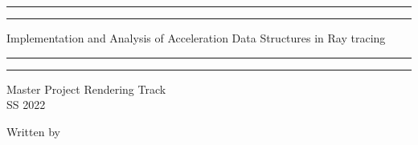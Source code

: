 \documentclass[11pt,a4paper]{article}
\begin{document}
  

\begin{titlepage} %

	\centering %
	
	\scshape %
	
	\vspace*{\baselineskip} %
	
	
	
	\rule{\textwidth}{1.6pt}\vspace*{-\baselineskip}\vspace*{2pt} %
	\rule{\textwidth}{0.4pt} %
	
	\vspace{0.75\baselineskip} %
	
	{\LARGE Implementation and Analysis of Acceleration Data Structures in Ray tracing\\} %
	
	\vspace{0.75\baselineskip} %
	
	\rule{\textwidth}{0.4pt}\vspace*{-\baselineskip}\vspace{3.2pt} %
	\rule{\textwidth}{1.6pt} %
	
	\vspace{2\baselineskip} %
	
	
	Master Project Rendering Track \\ 
	SS 2022 %
	
	\vspace*{3\baselineskip} %
	
	
	Written by
	
	\vspace{0.5\baselineskip} %
	

\end{titlepage}
\end{document}
